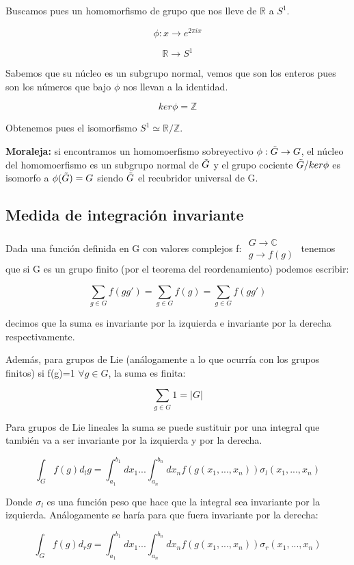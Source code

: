\smallskip
Buscamos pues un homomorfismo de grupo que nos lleve de $\mathds{R}$ a $S^1$.

$$\phi: x \to e^{2\pi i x}$$

$$\mathds{R} \to S^1$$

Sabemos que su núcleo es un subgrupo normal, vemos que son los enteros pues son los números que bajo $\phi$ nos llevan a la identidad.

$$ker \phi = \mathds{Z}$$

Obtenemos pues el isomorfismo $S^1 \simeq \mathds{R} / \mathds{Z}$.

\textbf{Moraleja:} si encontramos un homomoerfismo sobreyectivo $\phi: \Tilde{G} \to G$, el núcleo del homomoerfismo es un subgrupo normal de $\Tilde{G}$ y el grupo cociente $\Tilde{G}/ker\phi$ es isomorfo a $\phi (\Tilde{G})=G$ siendo $\Tilde{ G}$ el recubridor universal de G.


\subsection{Medida de integración invariante}

Dada una función definida en G con valores complejos f: $\begin{array}{c}
G \to \mathds{C}  \\
g \to f(g)
\end{array}$ tenemos que si G es un grupo finito (por el teorema del reordenamiento) podemos escribir:

$$\sum _{g\in G} f(gg')=\sum _{g\in G} f(g)=\sum _{g\in G} f(gg')$$

decimos que la suma es invariante por la izquierda e invariante por la derecha respectivamente.

\smallskip
Además, para grupos de Lie (análogamente a lo que ocurría con los grupos finitos) si f(g)=1 $\forall g \in G$, la suma es finita:

$$\sum _{g \in G} 1 =|G|$$

Para grupos de Lie lineales la suma se puede sustituir por una integral que también va a ser invariante por la izquierda y por la derecha.

$$\int _G f(g)d_lg=\int ^{b_1}_{a_1} dx_1...\int ^{b_n}_{a_n} dx_n f(g(x_1,...,x_n))\sigma _l(x_1,...,x_n)$$

Donde $\sigma _l$ es una función peso que hace que la integral sea invariante por la izquierda. Análogamente se haría para que fuera invariante por la derecha:

$$\int _G f(g)d_rg=\int ^{b_1}_{a_1} dx_1...\int ^{b_n}_{a_n} dx_n f(g(x_1,...,x_n))\sigma _r(x_1,...,x_n)$$

